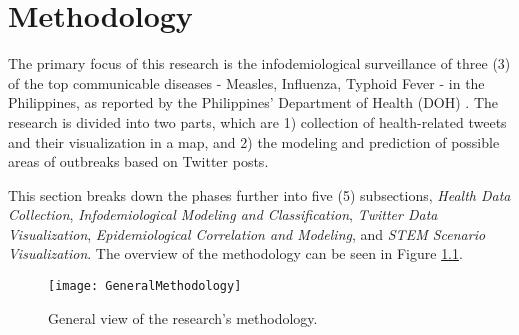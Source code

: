 \chapter{Methodology}

The primary focus of this research is the infodemiological surveillance of three (3) of the top communicable diseases - Measles, Influenza, Typhoid Fever -  in the Philippines, as reported by the Philippines' Department of Health (DOH) \cite{dohrecord2015}. The research is divided into two parts, which are 1) collection of health-related tweets and their visualization in a map, and 2) the modeling and prediction of possible areas of outbreaks based on Twitter posts.

This section breaks down the phases further into five (5) subsections, \textit{Health Data Collection}, \textit{Infodemiological Modeling and Classification}, \textit{Twitter Data Visualization}, \textit{Epidemiological Correlation and Modeling}, and \textit{STEM Scenario Visualization}. The overview of the methodology can be seen in Figure \ref{fig:GeneralMethodology}.


\begin{figure}[!ht]
    \centering
    \texttt{[image: GeneralMethodology]}
	\caption{General view of the research's methodology.}
	\label{fig:GeneralMethodology}
\end{figure}


